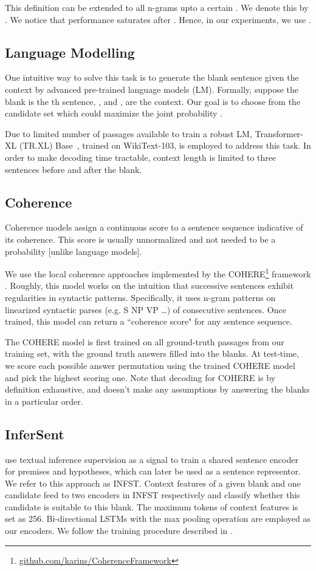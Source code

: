\documentclass[11pt,a4paper]{article}
\begin{document}
This definition can be extended to all n-grams upto a certain . We denote this by . We notice that  performance saturates after . Hence, in our experiments, we use . 

\subsection{Language Modelling}
One intuitive way to solve this task is to generate the blank sentence given the context by advanced pre-trained language models (LM). Formally, suppose the blank is the th sentence, , and ,  are the context. Our goal is to choose  from the candidate set which could maximize the joint probability .

Due to limited number of passages available to train a robust LM, Transformer-XL (TR.XL) Base~\cite{dai2019transformer}, trained on WikiText-103, is employed to address this task. In order to make decoding time tractable, context length is limited to three sentences before and after the blank.


\subsection{Coherence}
Coherence models assign a continuous score to a sentence sequence indicative of its coherence. This score is usually unnormalized and not needed to be a probability [unlike language models]. 


We use the local coherence approaches implemented by the \textsc{COHERE}\footnote{\url{github.com/karins/CoherenceFramework}} framework \cite{smith2016cohere}. Roughly, this model works on the intuition that successive sentences exhibit regularities in syntactic patterns. Specifically, it uses n-gram patterns on linearized syntactic parses (e.g. S NP VP \ldots) of consecutive sentences. Once trained, this model can return a ``coherence score" for any sentence sequence.


The \textsc{COHERE} model is first trained on all ground-truth passages from our training set, with the ground truth answers filled into the blanks. At test-time, we score each possible answer permutation using the trained \textsc{COHERE} model and pick the highest scoring one. Note that decoding for \textsc{COHERE} is by definition exhaustive, and doesn't make any assumptions by answering the blanks in a particular order.

\subsection{InferSent}
 use textual inference supervision as a signal to train a shared sentence encoder for premises and hypotheses, which can later be used as a sentence representor. We refer to this approach as \textsc{INFST}.
Context features of a given blank and one candidate feed to two encoders in \textsc{INFST} respectively and classify whether this candidate is suitable to this blank. The maximum tokens of context features is set as 256. Bi-directional LSTMs with the max pooling operation are employed as our encoders. We follow the training procedure described in .
\end{document}

